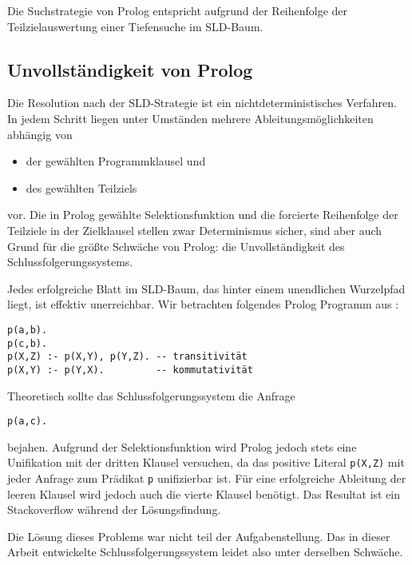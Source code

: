 Die Suchstrategie von Prolog entspricht aufgrund der Reihenfolge der Teilzielauswertung einer Tiefensuche im SLD-Baum.

\subsection{Unvollständigkeit von Prolog}
Die Resolution nach der SLD-Strategie ist ein nichtdeterministisches Verfahren. In jedem Schritt liegen unter Umständen mehrere Ableitungsmöglichkeiten abhängig von

\begin{itemize}
\item der gewählten Programmklausel und
\item des gewählten Teilziels
\end{itemize}

vor. Die in Prolog gewählte Selektionsfunktion und die forcierte Reihenfolge der Teilziele in der Zielklausel stellen zwar Determinismus sicher, sind aber auch Grund für die größte Schwäche von Prolog: die Unvollständigkeit des Schlussfolgerungssystems. \cite{beckstein}

Jedes erfolgreiche Blatt im SLD-Baum, das hinter einem unendlichen Wurzelpfad liegt, ist effektiv unerreichbar. Wir betrachten folgendes Prolog Programm aus \cite{lloyd}:

\begin{verbatim}
p(a,b).
p(c,b).
p(X,Z) :- p(X,Y), p(Y,Z). -- transitivität
p(X,Y) :- p(Y,X).         -- kommutativität
\end{verbatim}
\noindent
Theoretisch sollte das Schlussfolgerungssystem die Anfrage

\begin{verbatim}
p(a,c).
\end{verbatim}
\noindent
bejahen. Aufgrund der Selektionsfunktion wird Prolog jedoch stets eine Unifikation mit der dritten Klausel versuchen, da das positive Literal {\tt p(X,Z)} mit jeder Anfrage zum Prädikat {\tt p} unifizierbar ist. Für eine erfolgreiche Ableitung der leeren Klausel wird jedoch auch die vierte Klausel benötigt. Das Resultat ist ein Stackoverflow während der Lösungsfindung.

Die Lösung dieses Problems war nicht teil der Aufgabenstellung. Das in dieser Arbeit entwickelte Schlussfolgerungssystem leidet also unter derselben Schwäche.
